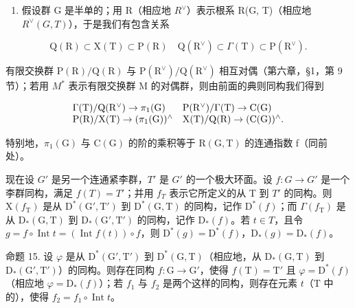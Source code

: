 \begin{enumerate}
\def\labelenumi{\arabic{enumi})}
\setcounter{enumi}{1}
\tightlist
\item
  假设群 G 是半单的；用 R（相应地 \(R^{\vee}\)）表示根系 R(G, T)（相应地 \(R^{\vee}(G, T)\)），于是我们有包含关系
\end{enumerate}

\[
\mathrm{Q} (\mathrm{R}) \subset \mathrm{X} (\mathrm{T}) \subset \mathrm{P} (\mathrm{R}) \quad \mathrm{Q} (\mathrm{R} ^ {\vee}) \subset \Gamma (\mathrm{T}) \subset \mathrm{P} (\mathrm{R} ^ {\vee}).
\]

有限交换群 \(\mathrm{P}(\mathrm{R})/\mathrm{Q}(\mathrm{R})\) 与 \(\mathrm{P}(\mathrm{R}^{\vee})/\mathrm{Q}(\mathrm{R}^{\vee})\) 相互对偶（第六章，§1，第 9 节）；若用 \(M^{*}\) 表示有限交换群 M 的对偶群，则由前面的典则同构我们得到

\[
\begin{array}{l l} \Gamma (\mathrm{T}) / \mathrm{Q} (\mathrm{R} ^ {\vee}) \to \pi_ {1} (\mathrm{G}) & \mathrm{P} (\mathrm{R} ^ {\vee}) / \Gamma (\mathrm{T}) \to \mathrm{C} (\mathrm{G}) \\ \mathrm{P} (\mathrm{R}) / \mathrm{X} (\mathrm{T}) \to (\pi_ {1} (\mathrm{G})) ^ {\wedge} & \mathrm{X} (\mathrm{T}) / \mathrm{Q} (\mathrm{R}) \to (\mathrm{C} (\mathrm{G})) ^ {\wedge}. \end{array}
\]

特别地，\(\pi_{1}(\mathrm{G})\) 与 \(\mathrm{C}(\mathrm{G})\) 的阶的乘积等于 \(\mathrm{R}(\mathrm{G},\mathrm{T})\) 的连通指数 f（同前处）。

现在设 \(G'\) 是另一个连通紧李群，\(T'\) 是 \(G'\) 的一个极大环面。设 \(f: G \to G'\) 是一个李群同构，满足 \(f(T) = T'\)；并用 \(f_{T}\) 表示它所定义的从 T 到 \(T'\) 的同构。则 \(\mathrm{X}(f_{\mathrm{T}})\) 是从 \(\mathrm{D}^{*}(\mathrm{G}', \mathrm{T}')\) 到 \(\mathrm{D}^{*}(\mathrm{G}, \mathrm{T})\) 的同构，记作 \(\mathrm{D}^{*}(f)\)；而 \(\Gamma(f_{\mathrm{T}})\) 是从 \(\mathrm{D}_{*}(\mathrm{G}, \mathrm{T})\) 到 \(\mathrm{D}_{*}(\mathrm{G}', \mathrm{T}')\) 的同构，记作 \(\mathrm{D}_{*}(f)\)。若 \(t \in T\)，且令 \(g = f \circ \operatorname{Int} t = (\operatorname{Int} f(t)) \circ f\)，则 \(\mathrm{D}^{*}(g) = \mathrm{D}^{*}(f)\)，\(\mathrm{D}_{*}(g) = \mathrm{D}_{*}(f)\)。

命题 15. 设 \(\varphi\) 是从 \(\mathrm{D}^*(\mathrm{G}',\mathrm{T}')\) 到 \(\mathrm{D}^*(\mathrm{G},\mathrm{T})\)（相应地，从 \(\mathrm{D}_*(\mathrm{G},\mathrm{T})\) 到 \(\mathrm{D}_*(\mathrm{G}',\mathrm{T}')\)）的同构。则存在同构 \(f:\mathrm{G}\to \mathrm{G}'\)，使得 \(f(\mathrm{T}) = \mathrm{T}'\) 且 \(\varphi = \mathrm{D}^*(f)\)（相应地 \(\varphi = \mathrm{D}_*(f)\)）；若 \(f_{1}\) 与 \(f_{2}\) 是两个这样的同构，则存在元素 \(t\)（\(\mathrm{T}\) 中的），使得 \(f_{2} = f_{1}\circ \operatorname {Int}t\)。

